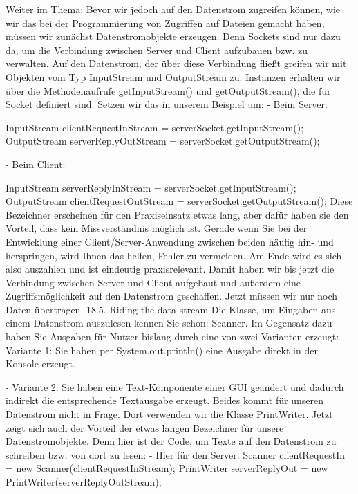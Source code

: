 Weiter im Thema:
Bevor wir jedoch auf den Datenstrom zugreifen können, wie wir das bei der Programmierung von Zugriffen auf Dateien gemacht haben, müssen wir zunächst Datenstromobjekte erzeugen. Denn Sockets sind nur dazu da, um die Verbindung zwischen Server und Client aufzubauen bzw. zu verwalten. Auf den Datenstrom, der über diese Verbindung fließt greifen wir mit Objekten vom Typ InputStream und OutputStream zu.
Instanzen erhalten wir über die Methodenaufrufe getInputStream() und getOutputStream(), die für Socket definiert sind. Setzen wir das in unserem Beispiel um:
-	Beim Server:

InputStream clientRequestInStream = serverSocket.getInputStream();
OutputStream serverReplyOutStream = serverSocket.getOutputStream();

-	Beim Client:

InputStream serverReplyInStream = serverSocket.getInputStream();
OutputStream clientRequestOutStream = serverSocket.getOutputStream();
Diese Bezeichner erscheinen für den Praxiseinsatz etwas lang, aber dafür haben sie den Vorteil, dass kein Missverständnis möglich ist. Gerade wenn Sie bei der Entwicklung einer Client/Server-Anwendung zwischen beiden häufig hin- und herspringen, wird Ihnen das helfen, Fehler zu vermeiden. Am Ende wird es sich also auszahlen und ist eindeutig praxisrelevant.
Damit haben wir bis jetzt die Verbindung zwischen Server und Client aufgebaut und außerdem eine Zugriffsmöglichkeit auf den Datenstrom geschaffen. Jetzt müssen wir nur noch Daten übertragen.
18.5.	Riding the data stream
Die Klasse, um Eingaben aus einem Datenstrom auszulesen kennen Sie schon: Scanner.
Im Gegensatz dazu haben Sie Ausgaben für Nutzer bislang durch eine von zwei Varianten erzeugt:
-	Variante 1: 
Sie haben per System.out.println() eine Ausgabe direkt in der Konsole erzeugt.

-	Variante 2:
Sie haben eine Text-Komponente einer GUI geändert und dadurch indirekt die entsprechende Textausgabe erzeugt.
Beides kommt für unseren Datenstrom nicht in Frage. Dort verwenden wir die Klasse PrintWriter.
Jetzt zeigt sich auch der Vorteil der etwas langen Bezeichner für unsere Datenstromobjekte. Denn hier ist der Code, um Texte auf den Datenstrom zu schreiben bzw. von dort zu lesen:
-	Hier für den Server:
Scanner clientRequestIn = new Scanner(clientRequestInStream);
PrintWriter serverReplyOut = new PrintWriter(serverReplyOutStream);

